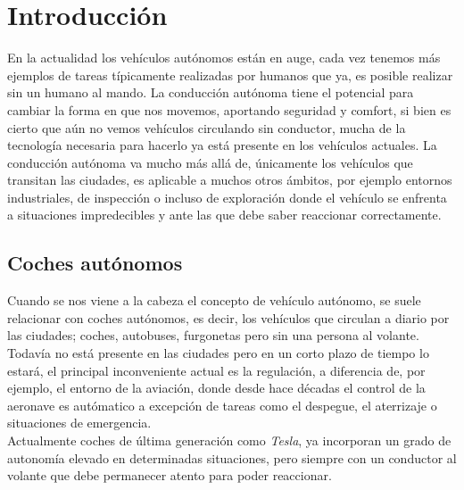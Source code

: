 \chapter{Introducción}
\label{cap:capitulo1}
\setcounter{page}{1}

En la actualidad los vehículos autónomos están en auge, cada vez tenemos más ejemplos de tareas típicamente realizadas por humanos que ya, es posible realizar sin un humano al mando. La conducción autónoma tiene el potencial para cambiar la forma en que nos movemos, aportando seguridad y comfort, si bien es cierto que aún no vemos vehículos circulando sin conductor, mucha de la tecnología necesaria para hacerlo ya está presente en los vehículos actuales. La conducción autónoma va mucho más allá de, únicamente los vehículos que transitan las ciudades, es aplicable a muchos otros ámbitos, por ejemplo entornos industriales, de inspección o incluso de exploración donde el vehículo se enfrenta a situaciones impredecibles y ante las que debe saber reaccionar correctamente.\\

\section{Coches autónomos}
\label{sec:cochesautonomos} %
Cuando se nos viene a la cabeza el concepto de vehículo autónomo, se suele relacionar con coches autónomos, es decir, los vehículos que circulan a diario por las ciudades; coches, autobuses, furgonetas pero sin una persona al volante. Todavía no está presente en las ciudades pero en un corto plazo de tiempo lo estará, el principal inconveniente actual es la regulación, a diferencia de, por ejemplo, el entorno de la aviación, donde desde hace décadas el control de la aeronave es autómatico a excepción de tareas como el despegue, el aterrizaje o situaciones de emergencia.\\

Actualmente coches de última generación como \textit{Tesla}, ya incorporan un grado de autonomía elevado en determinadas situaciones, pero siempre con un conductor al volante que debe permanecer atento para poder reaccionar.\\

